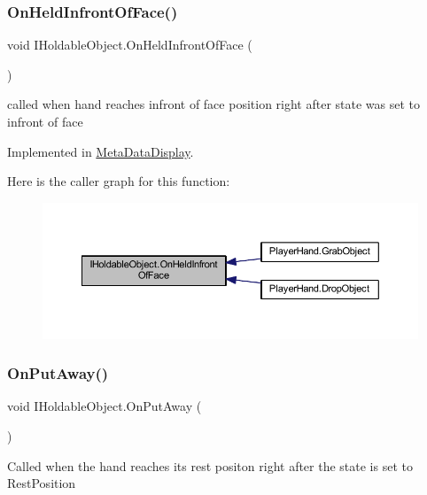 \subsubsection{\texorpdfstring{On\+Held\+Infront\+Of\+Face()}{OnHeldInfrontOfFace()}}
{\footnotesize\ttfamily void I\+Holdable\+Object.\+On\+Held\+Infront\+Of\+Face (\begin{DoxyParamCaption}{ }\end{DoxyParamCaption})}



called when hand reaches infront of face position right after state was set to infront of face 



Implemented in \mbox{\hyperlink{class_meta_data_display_ab91c62e23ca6af27f8a30859d5a172c9}{Meta\+Data\+Display}}.

Here is the caller graph for this function\+:
\nopagebreak
\begin{figure}[H]
\begin{center}
\leavevmode
\includegraphics[width=350pt]{interface_i_holdable_object_a6f63fec8fb8f715ad5cdd08aa5ec0ea5_icgraph}
\end{center}
\end{figure}
\mbox{\label{interface_i_holdable_object_abe7c5e5ed97fb5c908c91da5b8714f0e}} 
\subsubsection{\texorpdfstring{On\+Put\+Away()}{OnPutAway()}}
{\footnotesize\ttfamily void I\+Holdable\+Object.\+On\+Put\+Away (\begin{DoxyParamCaption}{ }\end{DoxyParamCaption})}





Called when the hand reaches it\textquotesingle{}s rest positon right after the state is set to Rest\+Position 


